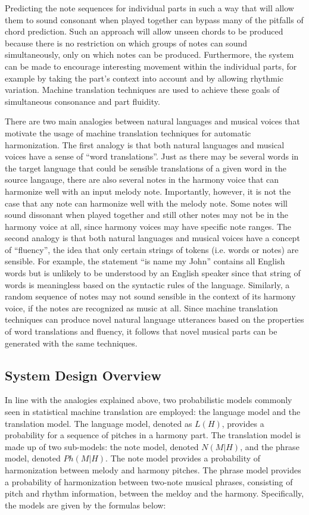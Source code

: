 \documentclass{sig-alternate}
\begin{document}
Predicting the note sequences for individual parts in such a way that will allow them to sound consonant when played together can bypass many of the pitfalls of chord prediction. 
Such an approach will allow unseen chords to be produced because there is no restriction on which groups of notes can sound simultaneously, only on which notes can be produced. Furthermore, the system can be made to encourage interesting movement within the individual parts, for example by taking the part's context into account and by allowing rhythmic variation. Machine translation techniques are used to achieve these goals of simultaneous consonance and part fluidity.

There are two main analogies between natural languages and musical voices that motivate the usage of machine translation techniques for automatic harmonization. The first analogy is that both natural languages and musical voices have a sense of ``word translations''. Just as there may be several words in the target language that could be sensible translations of a given word in the source 
langauge, there are also several notes in the harmony voice that can harmonize well with an input melody note. Importantly, however, it is not the case that any note can harmonize well with the melody note. Some notes will sound dissonant when played together and still other notes may not be in the harmony voice at all, since harmony voices may have specific note ranges. The second analogy is that both natural languages and musical voices have a concept of ``fluency'', the idea that only certain strings of tokens (i.e. words or notes) are sensible. For example, the statement ``is name my John'' contains all English words but is unlikely to be understood by an English speaker since that string of words is meaningless based on the syntactic rules of the language. Similarly, a random sequence of notes may not sound sensible in the context of its harmony voice, if the notes are recognized as music at all. Since machine translation techniques can produce novel natural language utterances based on the properties of word translations and fluency, it follows that novel musical parts can be generated with the same techniques.

\subsection{System Design Overview}

In line with the analogies explained above, two probabilistic models commonly seen in statistical machine translation are employed: the language model and the translation model. The language model, denoted as $L(H)$, provides a probability for a sequence of pitches in a harmony part. The translation model is made up of two sub-models: the note model, denoted $N(M|H)$, and the phrase model, denoted $Ph(M|H)$. The note model provides a probability of harmonization between melody and harmony pitches. The phrase model provides a probability of harmonization between two-note musical phrases, consisting of pitch and rhythm information, between the meldoy and the harmony. Specifically, the models are given by the formulas below: 
\\
\end{document}

